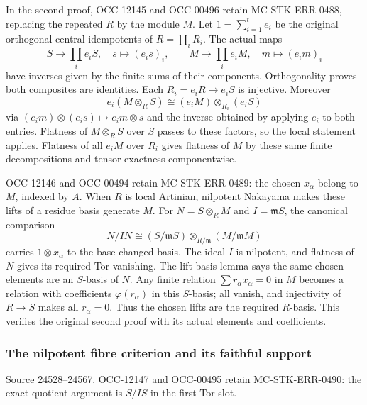 In the second proof, OCC-12145 and OCC-00496 retain MC-\AlgebraIdentifierBreak{}STK-\AlgebraIdentifierBreak{}ERR-\AlgebraIdentifierBreak{}0488, replacing the repeated \(R\) by the module \(M\). Let \(1=\sum_{i=1}^t e_i\) be the original orthogonal central idempotents of \(R=\prod_i R_i\). The actual maps \[
S\longrightarrow\prod_i e_iS,\quad s\longmapsto(e_is)_i,
\qquad
M\longrightarrow\prod_i e_iM,\quad m\longmapsto(e_im)_i
\] have inverses given by the finite sums of their components. Orthogonality proves both composites are identities. Each \(R_i=e_iR\to e_iS\) is injective. Moreover \[
e_i(M\otimes_RS)\cong(e_iM)\otimes_{R_i}(e_iS)
\] via \((e_im)\otimes(e_is)\mapsto e_im\otimes s\) and the inverse obtained by applying \(e_i\) to both entries. Flatness of \(M\otimes_RS\) over \(S\) passes to these factors, so the local statement applies. Flatness of all \(e_iM\) over \(R_i\) gives flatness of \(M\) by these same finite decompositions and tensor exactness componentwise.

OCC-12146 and OCC-00494 retain MC-\AlgebraIdentifierBreak{}STK-\AlgebraIdentifierBreak{}ERR-\AlgebraIdentifierBreak{}0489: the chosen \(x_\alpha\) belong to \(M\), indexed by \(A\). When \(R\) is local Artinian, nilpotent Nakayama makes these lifts of a residue basis generate \(M\). For \(N=S\otimes_RM\) and \(I=\mathfrak mS\), the canonical comparison \[
N/IN\cong(S/\mathfrak mS)\otimes_{R/\mathfrak m}(M/\mathfrak mM)
\] carries \(1\otimes x_\alpha\) to the base-changed basis. The ideal \(I\) is nilpotent, and flatness of \(N\) gives its required Tor vanishing. The lift-basis lemma says the same chosen elements are an \(S\)-basis of \(N\). Any finite relation \(\sum r_\alpha x_\alpha=0\) in \(M\) becomes a relation with coefficients \(\varphi(r_\alpha)\) in this \(S\)-basis; all vanish, and injectivity of \(R\to S\) makes all \(r_\alpha=0\). Thus the chosen lifts are the required \(R\)-basis. This verifies the original second proof with its actual elements and coefficients.

\subsubsection{The nilpotent fibre criterion and its faithful support}\label{algebra-proof-017-the-nilpotent-fibre-criterion-and-its-faithful-support}

Source 24528--24567. OCC-12147 and OCC-00495 retain MC-\AlgebraIdentifierBreak{}STK-\AlgebraIdentifierBreak{}ERR-\AlgebraIdentifierBreak{}0490: the exact quotient argument is \(S/IS\) in the first Tor slot.

